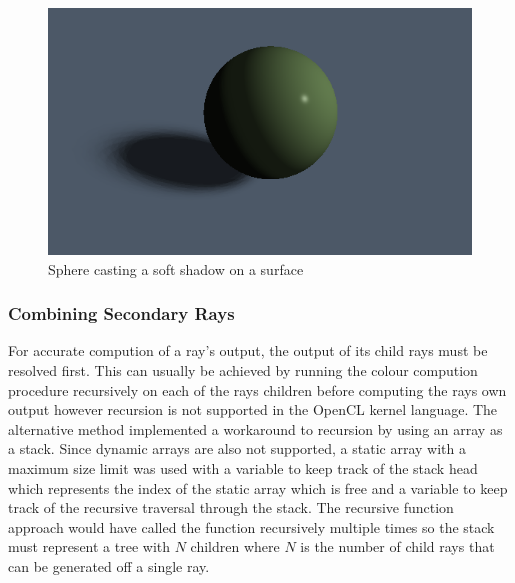 \documentclass[final]{cmpreport}
\begin{document}
\begin{figure}
    \centering
    \includegraphics[width=\textwidth]{img/soft_shadow.png}
    \caption{Sphere casting a soft shadow on a surface}
    \label{soft_shadow}
\end{figure}

\subsubsection{Combining Secondary Rays}

For accurate compution of a ray's output, the output of its child rays must be resolved first. This can usually be achieved by running the colour compution procedure recursively on each of the rays children before computing the rays own output however recursion is not supported in the OpenCL kernel language. The alternative method implemented a workaround to recursion by using an array as a stack. Since dynamic arrays are also not supported, a static array with a maximum size limit was used with a variable to keep track of the stack head which represents the index of the static array which is free and a variable to keep track of the recursive traversal through the stack. The recursive function approach would have called the function recursively multiple times so the stack must represent a tree with $N$ children where $N$ is the number of child rays that can be generated off a single ray.
\end{document}
